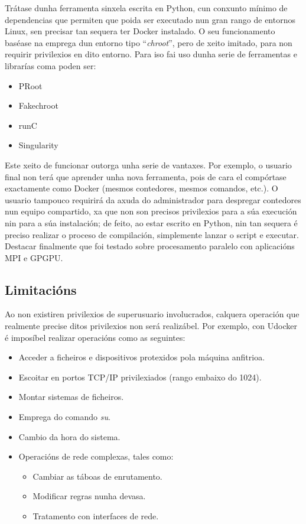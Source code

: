 Trátase dunha ferramenta sinxela escrita en Python, cun conxunto mínimo de dependencias que permiten que poida ser executado nun gran rango de entornos Linux, sen precisar tan sequera ter Docker instalado. O seu funcionamento baséase na emprega dun entorno tipo ``\textit{chroot}'', pero de xeito imitado, para non requirir privilexios en dito entorno. Para iso fai uso dunha serie de ferramentas e librarías coma poden ser:

\begin{itemize}
    \item PRoot
    \item Fakechroot
    \item runC
    \item Singularity
\end{itemize}

Este xeito de funcionar outorga unha serie de vantaxes. Por exemplo, o usuario final non terá que aprender unha nova ferramenta, pois de cara el compórtase exactamente como Docker (mesmos contedores, mesmos comandos, etc.). O usuario tampouco requirirá da axuda do administrador para despregar contedores nun equipo compartido, xa que non son precisos privilexios para a súa execución nin para a súa instalación; de feito, ao estar escrito en Python, nin tan sequera é preciso realizar o proceso de compilación, simplemente lanzar o script e executar. Destacar finalmente que foi testado sobre procesamento paralelo con aplicacións \gls{MPI} e \gls{GPGPU}. \cite{UdockerDoc}

\subsection{Limitacións}

Ao non existiren privilexios de superusuario involucrados, calquera operación que realmente precise ditos privilexios non será realizábel. Por exemplo, con Udocker é imposíbel realizar operacións como as seguintes:

\begin{itemize}
    \item Acceder a ficheiros e dispositivos protexidos pola máquina anfitrioa.
    \item Escoitar en portos TCP/IP privilexiados (rango embaixo do 1024).
    \item Montar sistemas de ficheiros.
    \item Emprega do comando \textit{su}.
    \item Cambio da hora do sistema.
    \item Operacións de rede complexas, tales como:
    \begin{itemize}
        \item Cambiar as táboas de enrutamento.
        \item Modificar regras nunha devasa.
        \item Tratamento con interfaces de rede.
    \end{itemize}
\end{itemize}

